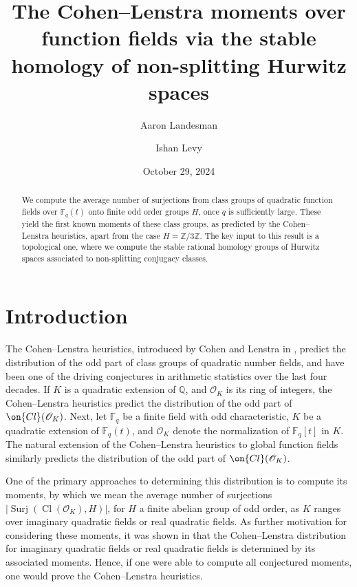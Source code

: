 \documentclass[12 pt]{amsart}
\title{The Cohen--Lenstra moments over function fields via the stable homology of non-splitting Hurwitz spaces}
\author{Aaron Landesman}
\author{Ishan Levy}
\theoremstyle{plain}
\theoremstyle{definition}
\theoremstyle{remark}
\numberwithin{equation}{section}
\DeclareMathOperator\cl{Cl}
\DeclareMathOperator\surj{Surj}
\begin{document}
\date{October 29, 2024}
\begin{abstract}
	We compute the average number of surjections from class groups of
	quadratic function fields over $\mathbb F_q(t)$ onto finite odd order
	groups $H$, once $q$ is sufficiently large. These yield the first known
	moments of these class groups, as predicted by the Cohen--Lenstra heuristics, apart from the case
	$H = \mathbb Z/3\mathbb Z$. The key input to this result is a
	topological one, where we compute the stable rational homology groups of Hurwitz
	spaces associated to non-splitting conjugacy classes.
\end{abstract}

\maketitle
\tableofcontents

\section{Introduction}

The Cohen--Lenstra heuristics, introduced by Cohen and Lenstra in
\cite{cohen1984heuristics}, predict the distribution of the odd part
of class groups of quadratic number fields, and have been one of the driving conjectures in
arithmetic statistics over the last four decades.
If $K$ is a quadratic extension of $\mathbb Q$, and $\mathscr O_K$ is its ring
of integers, the Cohen--Lenstra heuristics predict the distribution of the odd
part of $\on{Cl}(\mathscr O_K)$.
Next, let $\mathbb F_q$ be a finite field with odd characteristic,
$K$ be a quadratic extension of $\mathbb F_q(t)$,
and $\mathscr O_K$ denote the normalization of $\mathbb F_q[t]$
in $K$. The natural extension of the Cohen--Lenstra heuristics to global function
fields similarly predicts the distribution of the odd
part of $\on{Cl}(\mathscr O_K)$.

One of the primary approaches to determining this distribution is to compute its
moments, by which we mean the average number of surjections $\left|
\surj(\cl(\mathscr O_K), H) \right|$, for $H$ a finite abelian group of odd
order, as $K$ ranges over imaginary quadratic fields or real quadratic fields.
As further motivation for considering these moments, it was shown in 
\cite[Theorem 1.3]{wangW:moments-and-interpretations}
that the Cohen--Lenstra distribution for imaginary
quadratic fields or real quadratic fields is determined by its associated
moments. Hence, if one were
able to compute all conjectured moments, one would prove the Cohen--Lenstra
heuristics.
\end{document}

